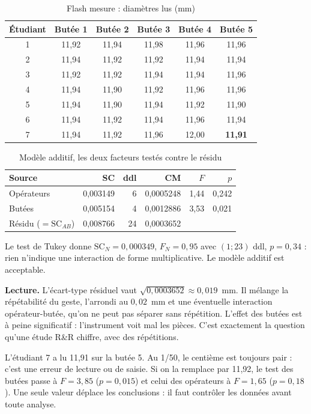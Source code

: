 \documentclass[11pt,a4paper]{article}
\theoremstyle{sj}
\theoremstyle{definition}
\theoremstyle{remark}
\newcommand{\SC}{\mathrm{SC}}
\begin{document}
\begin{table}[h]
\centering
\caption{Flash mesure : diamètres lus (mm)}
\begin{tabular}{c c c c c c}
\toprule
Étudiant & Butée 1 & Butée 2 & Butée 3 & Butée 4 & Butée 5\\
\midrule
1 & 11,92 & 11,94 & 11,98 & 11,96 & 11,96\\
2 & 11,94 & 11,92 & 11,92 & 11,94 & 11,94\\
3 & 11,92 & 11,92 & 11,94 & 11,94 & 11,96\\
4 & 11,94 & 11,90 & 11,92 & 11,96 & 11,96\\
5 & 11,94 & 11,90 & 11,94 & 11,92 & 11,90\\
6 & 11,94 & 11,92 & 11,94 & 11,96 & 11,94\\
7 & 11,94 & 11,92 & 11,96 & 12,00 & \textbf{11,91}\\
\bottomrule
\end{tabular}
\end{table}

\begin{table}[h]
\centering
\caption{Modèle additif, les deux facteurs testés contre le résidu}
\begin{tabular}{l r r r r r}
\toprule
Source & SC & ddl & CM & $F$ & $p$\\
\midrule
Opérateurs & 0,003149 & 6 & 0,0005248 & 1,44 & 0,242\\
Butées & 0,005154 & 4 & 0,0012886 & 3,53 & 0,021\\
Résidu ($=\SC_{AB}$) & 0,008766 & 24 & 0,0003652 & &\\
\bottomrule
\end{tabular}
\end{table}

Le test de Tukey donne $\SC_N=0{,}000349$, $F_N=0{,}95$ avec $(1;23)$ ddl, $p=0{,}34$ : rien n'indique une interaction de forme multiplicative. Le modèle additif est acceptable.

\textbf{Lecture.} L'écart-type résiduel vaut $\sqrt{0{,}0003652}\approx0{,}019$~mm. Il mélange la répétabilité du geste, l'arrondi au $0{,}02$~mm et une éventuelle interaction opérateur-butée, qu'on ne peut pas séparer sans répétition. L'effet des butées est à peine significatif : l'instrument voit mal les pièces. C'est exactement la question qu'une étude R\&R chiffre, avec des répétitions.

\begin{attention}
L'étudiant 7 a lu 11,91 sur la butée 5. Au 1/50, le centième est toujours pair : c'est une erreur de lecture ou de saisie. Si on la remplace par 11,92, le test des butées passe à $F=3{,}85$ ($p=0{,}015$) et celui des opérateurs à $F=1{,}65$ ($p=0{,}18$). Une seule valeur déplace les conclusions : il faut contrôler les données avant toute analyse.
\end{attention}
\end{document}
